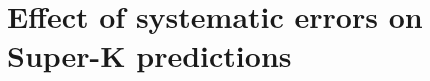 \section{Effect of systematic errors on Super-K predictions}
\label{app:sk_errors}







\clearpage